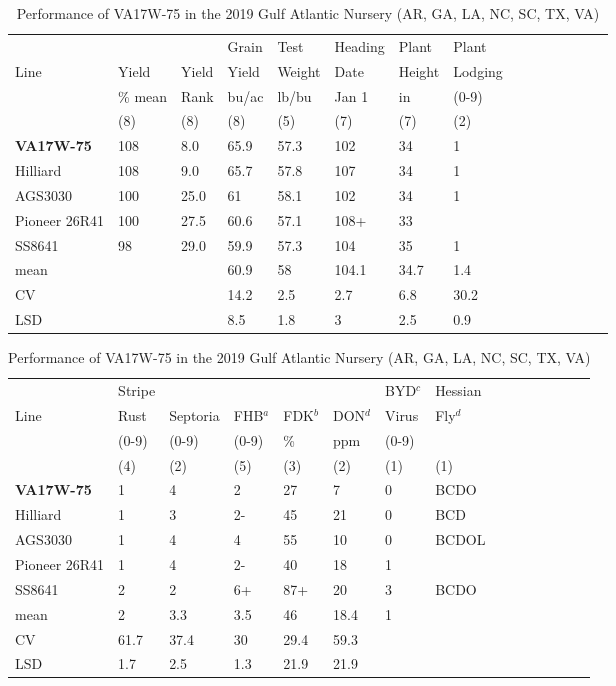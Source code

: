 \documentclass[12pt, letterpaper]{article}
\begin{document}
\begin{landscape}
\begin{table}[ht]
\caption{Performance of VA17W-75 in the 2019 Gulf Atlantic Nursery (AR, GA, LA, NC, SC, TX, VA)}
\label{gawn}
\begin{tabular}{lllllllllllllll}
  \hline
     &         &       & Grain & Test   & Heading & Plant  & Plant   \\
Line & Yield   & Yield & Yield & Weight & Date    & Height & Lodging \\
     & \% mean & Rank  & bu/ac & lb/bu  & Jan 1   & in     & (0-9)   \\
     & (8)     & (8)   & (8)   & (5)    & (7)     & (7)    & (2)     \\
  \hline
  \textbf{VA17W-75} & 108 &  8.0 & 65.9 & 57.3 & 102 & 34 & 1 \\ 
  Hilliard & 108 &  9.0 & 65.7 & 57.8 & 107 & 34 & 1 \\ 
  AGS3030 & 100 & 25.0 & 61 & 58.1 & 102 & 34 & 1 \\ 
  Pioneer 26R41 & 100 & 27.5 & 60.6 & 57.1 & 108+ & 33 \\ 
  SS8641 &  98 & 29.0 & 59.9 & 57.3 & 104 & 35 & 1 \\ 
  \hline
  mean &  &  & 60.9 & 58  & 104.1 & 34.7 & 1.4 \\ 
  CV   &  &  & 14.2 & 2.5 & 2.7   & 6.8  & 30.2 \\ 
  LSD  &  &  & 8.5  & 1.8 & 3     & 2.5  & 0.9 \\ 
   \hline
\end{tabular}

\bigskip

\begin{tabular}{lllllllllllllll}
  \hline
     & Stripe &          &       &     &     & BYD$^c$   & Hessian \\
Line & Rust   & Septoria & FHB$^a$   & FDK$^b$ & DON$^d$ & Virus & Fly$^d$ \\
     & (0-9)  & (0-9)    & (0-9) & \%  & ppm & (0-9) &  \\
     & (4)    & (2)      & (5)   & (3) & (2) & (1) & (1) \\
  \hline
  \textbf{VA17W-75} & 1 & 4 & 2 & 27 & 7 &  0 & BCDO \\ 
  Hilliard & 1 & 3 & 2- & 45 & 21 &  0 & BCD \\ 
  AGS3030 &  1 & 4 & 4 & 55 & 10 &  0 & BCDOL \\ 
  Pioneer 26R41 & 1 & 4 & 2- & 40 & 18 &  1 &  \\ 
  SS8641 &  2 & 2 & 6+ & 87+ & 20 &  3 & BCDO \\ 
  \hline
  mean & 2    & 3.3  & 3.5 & 46   & 18.4 & 1 &  \\ 
  CV   & 61.7 & 37.4 & 30  & 29.4 & 59.3 &   &  \\ 
  LSD  & 1.7  & 2.5  & 1.3 & 21.9 & 21.9 &   &  \\ 
   \hline
\end{tabular}


\end{table}
\end{landscape}
\end{document}
